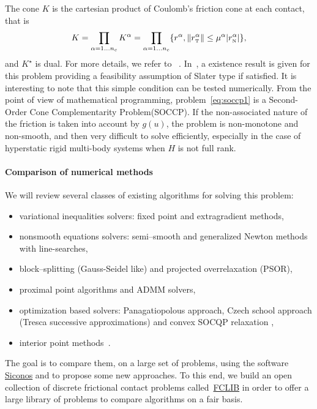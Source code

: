 \documentclass[10pt]{icccm2025}
\def\n{{\hbox{\tiny{N}}}}
\def\t{{\hbox{\tiny{T}}}}
\begin{document}
The cone $K$ is the cartesian product of Coulomb's friction cone at each contact, that is
\begin{equation}
  \label{eq:CC}
  K = \prod_{\alpha=1\ldots n_c} K^{\alpha}  = \prod_{\alpha=1\ldots n_c} \{r^\alpha, \|r^\alpha_\t \| \leq \mu^\alpha |r^\alpha_\n| \},
\end{equation}
and $K^\star$ is dual. For more details, we refer to ~\cite{acary2018solving}.
In~\cite{Acary.ea_ZAMM2011}, a existence result is given for this problem providing a feasibility assumption of Slater type if satisfied. It is interesting to note that this simple condition can be tested numerically. From the point of view of mathematical programming, problem~\eqref{eq:soccp1} is a Second-Order Cone Complementarity Problem(SOCCP).
If the non-associated nature of the friction is taken into account by $g(u)$, the problem is non-monotone and non-smooth, and then very difficult to solve efficiently, especially in the case of hyperstatic rigid multi-body systems when $H$ is not full rank.

\vspace{-0.3cm}
\paragraph{Comparison of numerical methods}We will review  several  classes of existing algorithms for solving this problem:
\vspace{-0.2cm}
\begin{itemize}
  \setlength{\parsep}{-4pt}
  \setlength{\itemsep}{-4pt}
\item variational inequalities solvers: fixed point and extragradient  methods,
\item nonsmooth equations solvers: semi--smooth and generalized Newton methods with line-searches,
\item block--splitting (Gauss-Seidel like) and projected overrelaxation (PSOR),
\item proximal point algorithms and ADMM solvers,
\item optimization based solvers: Panagatiopolous approach, Czech school approach (Tresca successive approximations) and convex SOCQP relaxation \cite{Dostal.ea_Book2023},
\item interior point methods~\cite{acary:hal-03913568}.
\end{itemize}
\vspace{-0.2cm}
The goal is to compare them, on a large set of problems, using the software \href{http://www.siconos.org}{\sc Siconos} and to propose some new approaches. To this end, we build an open collection of discrete frictional contact problems called~\href{https://frictionalcontactlibrary.github.io/index.html}{FCLIB} in order to offer a large library of problems to compare algorithms on a fair basis. 
\end{document}
